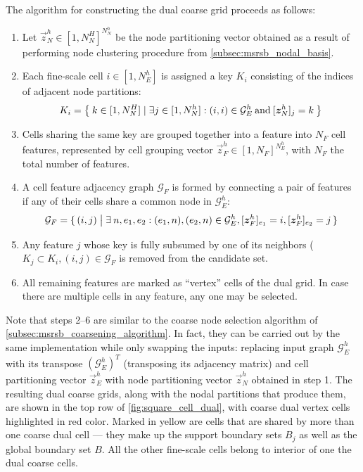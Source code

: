 The algorithm for constructing the dual coarse grid proceeds as follows:
\begin{enumerate}
    \item Let $\vec{z}_N^h \in [1,N_N^H]^{N_N^h}$ be the node partitioning vector obtained as a result of performing node clustering procedure from \cref{subsec:msrsb_nodal_basis}.
    \item Each fine-scale cell $i \in [1,N_E^h]$ is assigned a key $K_i$ consisting of the indices of adjacent node partitions:
    \begin{align}
        K_i = \Set{ k \in [1,N_N^H] \mid \exists j \in [1,N_N^h]: (i,i) \in \mathcal{G}_E^h \:\text{and}\: [\bm{z}_N^h]_j = k }
    \end{align}
    \item Cells sharing the same key are grouped together into a feature into $N_F$ cell features, represented by cell grouping vector $\vec{z}_F^h \in [1,N_F]^{N_E^h}$, with $N_F$ the total number of features.
    \item A cell feature adjacency graph $\mathcal{G}_F$ is formed by connecting a pair of features if any of their cells share a common node in $\mathcal{G}_E^h$:
    \begin{align}
        \mathcal{G}_F = \set{(i,j) \bigm| \exists \: n, e_1, e_2: (e_1,n), (e_2,n) \in \mathcal{G}_E^h, [\bm{z}_F^h]_{e_1} = i, [\bm{z}_F^h]_{e_2} = j}
    \end{align}
    \item Any feature $j$ whose key is fully subsumed by one of its neighbors ($K_j \subset K_i, (i,j) \in \mathcal{G}_F$ is removed from the candidate set.
    \item All remaining features are marked as ``vertex'' cells of the dual grid.   In case there are multiple cells in any feature, any one may be selected.
\end{enumerate}
Note that steps 2--6 are similar to the coarse node selection algorithm of \cref{subsec:msrsb_coarsening_algorithm}.   In fact, they can be carried out by the same implementation while only swapping the inputs: replacing input graph $\mathcal{G}_{E}^h$ with its transpose $(\mathcal{G}_{E}^h)^T$ (transposing its adjacency matrix) and cell partitioning vector $\vec{z}_E^h$ with node partitioning vector $\vec{z}_N^h$ obtained in step 1.   The resulting dual coarse grids, along with the nodal partitions that produce them, are shown in the top row of \cref{fig:square_cell_dual}, with coarse dual vertex cells highlighted in red color.   Marked in yellow are cells that are shared by more than one coarse dual cell --- they make up the support boundary sets $B_j$ as well as the global boundary set $B$.   All the other fine-scale cells belong to interior of one the dual coarse cells.


